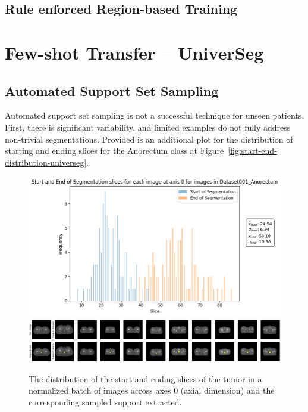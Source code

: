 \documentclass[12pt,twoside]{report}
\begin{document}
\subsection{Rule enforced Region-based Training}





\section{Few-shot Transfer -- UniverSeg}

\subsection{Automated Support Set Sampling}

Automated support set sampling is not a successful technique for unseen patients. First, there is significant variability, and limited examples do not fully address non-trivial segmentations. Provided is an additional plot for the distribution of starting and ending slices for the Anorectum class at Figure~\ref{fig:start-end-distribution-universeg}.


\begin{figure}[H]
  \centering
  \includegraphics[width=.8\linewidth]{../../research/source/code/UniverSeg/start_end_distribution_axis_0_anorectum.png}
  \includegraphics[width=\linewidth, trim=0 0 340px 0, clip]{../../research/source/code/UniverSeg/support_anorectum_axis_0.png}
  \caption{The distribution of the start and ending slices of the tumor in a normalized batch of images across axes 0 (axial dimension) and the corresponding sampled support extracted.}\label{fig:start-end-distribution-universeg-ax-0}
\end{figure}
\end{document}
